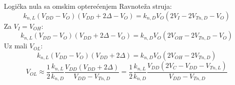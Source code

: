 \begin{frame}[label=09_1-s046]{Logička nula sa omskim opterećenjem}\setlength{\parskip}{2pt}\setlength{\abovedisplayskip}{4pt}\setlength{\belowdisplayskip}{4pt}\setlength{\abovedisplayshortskip}{3pt}\setlength{\belowdisplayshortskip}{3pt}
Ravnoteža struja:\[k_{n,L}(V_{DD}-V_O)(V_{DD}+2\Delta-V_O)=k_{n,D}V_O(2V_I-2V_{Tn,D}-V_O)\]
Za $V_I=V_{OH}$:\[k_{n,L}(V_{DD}-V_O)(V_{DD}+2\Delta-V_O)=k_{n,D}V_O(2V_{OH}-2V_{Tn,D}-V_O)\]
Uz mali $V_{OL}$:\[k_{n,L}(V_{DD}-V_O)(V_{DD}+2\Delta)=k_{n,D}V_O(2V_{OH}-2V_{Tn,D})\]
\[V_{OL}\approx\frac12\frac{k_{n,L}}{k_{n,D}}\frac{V_{DD}(V_{DD}+2\Delta)}{V_{DD}-V_{Tn,D}}=\frac12\frac{k_{n,L}}{k_{n,D}}\frac{V_{DD}(2V_C-V_{DD}-V_{Tn,L})}{V_{DD}-V_{Tn,D}}\]

\end{frame}
